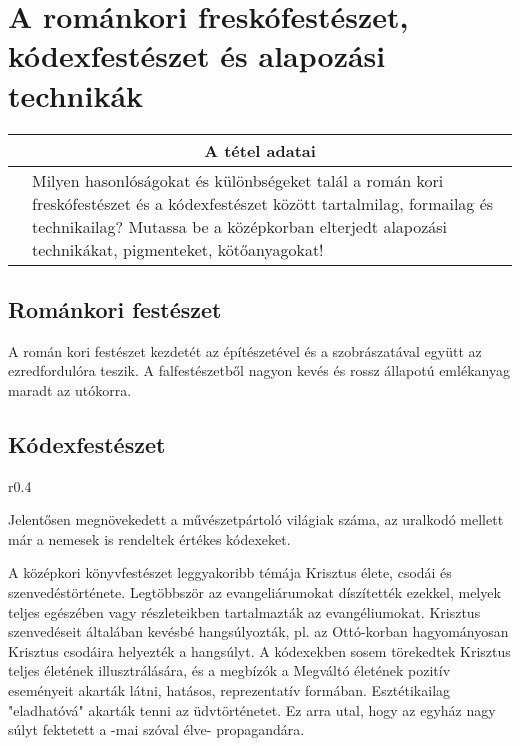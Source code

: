 	

\cleardoublepage


\section{A románkori freskófestészet, kódexfestészet és alapozási technikák}

\begin{center}
	\begin{longtable}{ | p{} | p{} | }
		
		\hline
		\multicolumn{2}{|c|}{\textbf{A tétel adatai}}
		\\ \hline
		
		\hline
		\centering{Tétel teljes címe}
		&
		Milyen hasonlóságokat és különbségeket talál a román kori freskófestészet és a kódexfestészet között tartalmilag, formailag és technikailag? Mutassa be a középkorban elterjedt alapozási technikákat, pigmenteket, kötőanyagokat!
		\\ \hline
		
	\end{longtable}
\end{center}

\subsection*{Románkori festészet}

A román kori festészet kezdetét az építészetével és a szobrászatával együtt az ezredfordulóra teszik. A falfestészetből nagyon kevés és rossz állapotú emlékanyag maradt az utókorra. 

\subsection*{Kódexfestészet}

\begin{wrapfigure}{r}{0.4\textwidth}
\end{wrapfigure}

Jelentősen megnövekedett a művészetpártoló világiak száma, az uralkodó mellett már a nemesek is rendeltek értékes kódexeket.

A középkori könyvfestészet leggyakoribb témája Krisztus élete, csodái és szenvedéstörténete. Legtöbbször az evangeliárumokat díszítették ezekkel, melyek teljes egészében vagy részleteikben tartalmazták az evangéliumokat. Krisztus szenvedéseit általában kevésbé hangsúlyozták, pl. az Ottó-korban hagyományosan Krisztus csodáira helyezték a hangsúlyt. A kódexekben sosem törekedtek Krisztus teljes életének illusztrálására, és a megbízók a Megváltó életének pozitív eseményeit akarták látni, hatásos, reprezentatív formában. Esztétikailag "eladhatóvá" akarták tenni az üdvtörténetet. Ez arra utal, hogy az egyház nagy súlyt fektetett a -mai szóval élve- propagandára.

